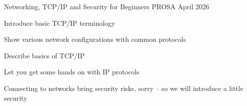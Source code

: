 \documentclass[Screen16to9,17pt]{foils}
\begin{document}









\mytitlepage
{Networking, TCP/IP and Security for Beginners}
{PROSA April 2026}


\hlkprofiluk



\begin{list2}
\item Introduce basic TCP/IP terminology
\item Show various network configurations with common protocols
\item Describe basics of TCP/IP
\item Let you get some hands on with IP protocols
\item Connecting to networks bring security risks, sorry -- so we will introduce a little security
\end{list2}
\end{document}
